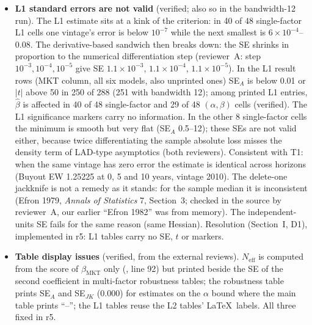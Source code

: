 \documentclass[11pt]{article}
\newcommand{\file}[1]{\path{#1}}
\begin{document}
\begin{itemize}
\item \textbf{L1 standard errors are not valid} (verified; also so in the bandwidth-12 run). The L1 estimate sits at a kink of the criterion: in 40 of 48 single-factor L1 cells one vintage's error is below $10^{-7}$ while the next smallest is $6\times10^{-4}$--0.08. The derivative-based sandwich then breaks down: the SE shrinks in proportion to the numerical differentiation step (reviewer~A: step $10^{-3},10^{-4},10^{-5}$ give SE $1.1\times10^{-3}$, $1.1\times10^{-4}$, $1.1\times10^{-5}$). In the L1 result rows (MKT column, all six models, also unprinted ones) SE$_A$ is below 0.01 or $|t|$ above 50 in 250 of 288 (251 with bandwidth 12); among printed L1 entries, $\hat\beta$ is affected in 40 of 48 single-factor and 29 of 48 $(\alpha,\beta)$ cells (verified). The L1 significance markers carry no information. In the other 8 single-factor cells the minimum is smooth but very flat (SE$_A$ 0.5--12); these SEs are not valid either, because twice differentiating the sample absolute loss misses the density term of LAD-type asymptotics (both reviewers). Consistent with T1: when the same vintage has zero error the estimate is identical across horizons (Buyout EW 1.25225 at 0, 5 and 10 years, vintage 2010). The delete-one jackknife is not a remedy as it stands: for the sample median it is inconsistent (Efron 1979, \emph{Annals of Statistics} 7, Section~3; checked in the source by reviewer~A, our earlier ``Efron 1982'' was from memory). The independent-units SE fails for the same reason (same Hessian). Resolution (Section~I, D1), implemented in r5: L1 tables carry no SE, $t$ or markers.
\item \textbf{Table display issues} (verified, from the external reviews). $N_{\mathrm{eff}}$ is computed from the score of $\beta_{\mathrm{MKT}}$ only (\file{helper/inference.R}, line 92) but printed beside the SE of the second coefficient in multi-factor robustness tables; the robustness table prints SE$_A$ and SE$_{JK}$ (0.000) for estimates on the $\alpha$ bound where the main table prints ``--''; the L1 tables reuse the L2 tables' \LaTeX\ labels. All three fixed in r5.

\end{itemize}
\end{document}
